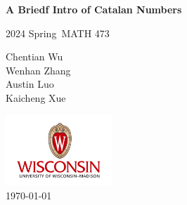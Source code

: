 
\begin{titlepage}
    \begin{center}
        \vspace*{2.7cm}
            
        \Huge
        \textbf{A Briedf Intro of Catalan Numbers}
            
        \vspace{1cm}
        \huge
        2024 Spring\ MATH 473\\
        \vspace{1.5cm}
        \Large
            
        Chentian Wu\\
        Wenhan Zhang\\
        Austin Luo\\
        Kaicheng Xue\vfill
        \vspace{1cm}  
    
        \includegraphics[width=0.3\textwidth]{templates/logo-wisc.png}\\
        \vspace{1cm}  
        \Large \today
        
    \end{center}
\end{titlepage}
